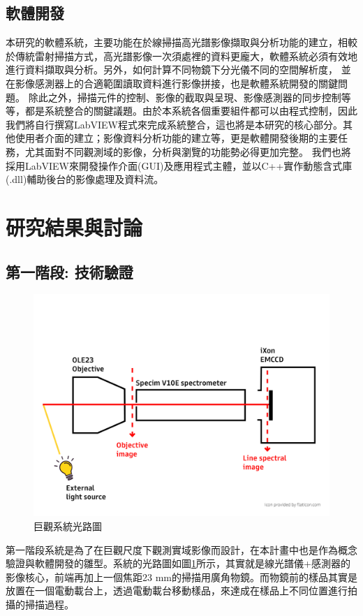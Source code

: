 \documentclass[12pt]{article}
\begin{document}
\subsection{軟體開發} \label{software}
本研究的軟體系統，主要功能在於線掃描高光譜影像擷取與分析功能的建立，相較於傳統雷射掃描方式，高光譜影像一次須處裡的資料更龐大，軟體系統必須有效地進行資料擷取與分析。另外，如何計算不同物鏡下分光儀不同的空間解析度，
並在影像感測器上的合適範圍讀取資料進行影像拼接，也是軟體系統開發的關鍵問題。
除此之外，掃描元件的控制、影像的截取與呈現、影像感測器的同步控制等等，都是系統整合的關鍵議題。由於本系統各個重要組件都可以由程式控制，因此我們將自行撰寫LabVIEW程式來完成系統整合，這也將是本研究的核心部分。其他使用者介面的建立；影像資料分析功能的建立等，更是軟體開發後期的主要任務，尤其面對不同觀測域的影像，分析與瀏覽的功能勢必得更加完整。
我們也將採用LabVIEW來開發操作介面(GUI)及應用程式主體，並以C++實作動態含式庫(.dll)輔助後台的影像處理及資料流。

\section{研究結果與討論}
\subsection{第一階段: 技術驗證}
\begin{figure}
    \centering
    \includegraphics[width = 0.9\linewidth]{lightPath.jpg}
    \caption{巨觀系統光路圖}
    \label{fig: macro path}
\end{figure}
第一階段系統是為了在巨觀尺度下觀測實域影像而設計，在本計畫中也是作為概念驗證與軟體開發的雛型。系統的光路圖如圖\ref{fig: macro path}所示，其實就是線光譜儀+感測器的影像核心，前端再加上一個焦距23 mm的掃描用廣角物鏡。而物鏡前的樣品其實是放置在一個電動載台上，透過電動載台移動樣品，來達成在樣品上不同位置進行拍攝的掃描過程。
\end{document}
